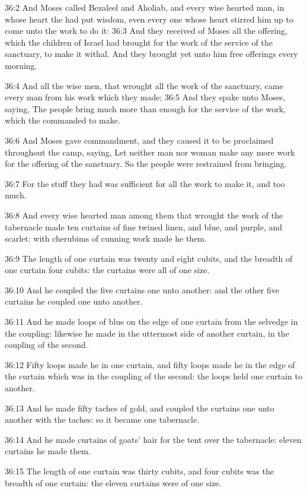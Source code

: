 36:2 And Moses called Bezaleel and Aholiab, and every wise hearted
man, in whose heart the \LORD had put wisdom, even every one whose
heart stirred him up to come unto the work to do it: 36:3 And they
received of Moses all the offering, which the children of Israel had
brought for the work of the service of the sanctuary, to make it
withal. And they brought yet unto him free offerings every morning.

36:4 And all the wise men, that wrought all the work of the sanctuary,
came every man from his work which they made; 36:5 And they spake unto
Moses, saying, The people bring much more than enough for the service
of the work, which the \LORD commanded to make.

36:6 And Moses gave commandment, and they caused it to be proclaimed
throughout the camp, saying, Let neither man nor woman make any more
work for the offering of the sanctuary. So the people were restrained
from bringing.

36:7 For the stuff they had was sufficient for all the work to make
it, and too much.

36:8 And every wise hearted man among them that wrought the work of
the tabernacle made ten curtains of fine twined linen, and blue, and
purple, and scarlet: with cherubims of cunning work made he them.

36:9 The length of one curtain was twenty and eight cubits, and the
breadth of one curtain four cubits: the curtains were all of one size.

36:10 And he coupled the five curtains one unto another: and the other
five curtains he coupled one unto another.

36:11 And he made loops of blue on the edge of one curtain from the
selvedge in the coupling: likewise he made in the uttermost side of
another curtain, in the coupling of the second.

36:12 Fifty loops made he in one curtain, and fifty loops made he in
the edge of the curtain which was in the coupling of the second: the
loops held one curtain to another.

36:13 And he made fifty taches of gold, and coupled the curtains one
unto another with the taches: so it became one tabernacle.

36:14 And he made curtains of goats' hair for the tent over the
tabernacle: eleven curtains he made them.

36:15 The length of one curtain was thirty cubits, and four cubits was
the breadth of one curtain: the eleven curtains were of one size.

